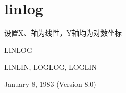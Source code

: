\section{linlog}
\label{cmd:linlog}

设置X、轴为线性，Y轴均为对数坐标

LINLOG

LINLIN, LOGLOG, LOGLIN

January 8, 1983 (Version 8.0)

